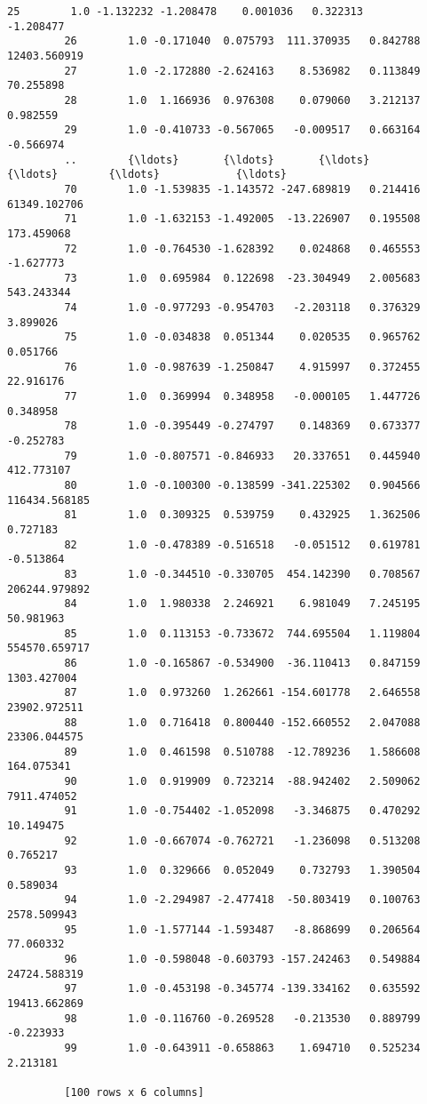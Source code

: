 \documentclass[11pt]{article}
\begin{document}
\begin{Verbatim}[commandchars=\\\{\}]
         25        1.0 -1.132232 -1.208478    0.001036   0.322313      -1.208477
         26        1.0 -0.171040  0.075793  111.370935   0.842788   12403.560919
         27        1.0 -2.172880 -2.624163    8.536982   0.113849      70.255898
         28        1.0  1.166936  0.976308    0.079060   3.212137       0.982559
         29        1.0 -0.410733 -0.567065   -0.009517   0.663164      -0.566974
         ..        {\ldots}       {\ldots}       {\ldots}         {\ldots}        {\ldots}            {\ldots}
         70        1.0 -1.539835 -1.143572 -247.689819   0.214416   61349.102706
         71        1.0 -1.632153 -1.492005  -13.226907   0.195508     173.459068
         72        1.0 -0.764530 -1.628392    0.024868   0.465553      -1.627773
         73        1.0  0.695984  0.122698  -23.304949   2.005683     543.243344
         74        1.0 -0.977293 -0.954703   -2.203118   0.376329       3.899026
         75        1.0 -0.034838  0.051344    0.020535   0.965762       0.051766
         76        1.0 -0.987639 -1.250847    4.915997   0.372455      22.916176
         77        1.0  0.369994  0.348958   -0.000105   1.447726       0.348958
         78        1.0 -0.395449 -0.274797    0.148369   0.673377      -0.252783
         79        1.0 -0.807571 -0.846933   20.337651   0.445940     412.773107
         80        1.0 -0.100300 -0.138599 -341.225302   0.904566  116434.568185
         81        1.0  0.309325  0.539759    0.432925   1.362506       0.727183
         82        1.0 -0.478389 -0.516518   -0.051512   0.619781      -0.513864
         83        1.0 -0.344510 -0.330705  454.142390   0.708567  206244.979892
         84        1.0  1.980338  2.246921    6.981049   7.245195      50.981963
         85        1.0  0.113153 -0.733672  744.695504   1.119804  554570.659717
         86        1.0 -0.165867 -0.534900  -36.110413   0.847159    1303.427004
         87        1.0  0.973260  1.262661 -154.601778   2.646558   23902.972511
         88        1.0  0.716418  0.800440 -152.660552   2.047088   23306.044575
         89        1.0  0.461598  0.510788  -12.789236   1.586608     164.075341
         90        1.0  0.919909  0.723214  -88.942402   2.509062    7911.474052
         91        1.0 -0.754402 -1.052098   -3.346875   0.470292      10.149475
         92        1.0 -0.667074 -0.762721   -1.236098   0.513208       0.765217
         93        1.0  0.329666  0.052049    0.732793   1.390504       0.589034
         94        1.0 -2.294987 -2.477418  -50.803419   0.100763    2578.509943
         95        1.0 -1.577144 -1.593487   -8.868699   0.206564      77.060332
         96        1.0 -0.598048 -0.603793 -157.242463   0.549884   24724.588319
         97        1.0 -0.453198 -0.345774 -139.334162   0.635592   19413.662869
         98        1.0 -0.116760 -0.269528   -0.213530   0.889799      -0.223933
         99        1.0 -0.643911 -0.658863    1.694710   0.525234       2.213181
         
         [100 rows x 6 columns]
\end{Verbatim}
            
\end{document}
